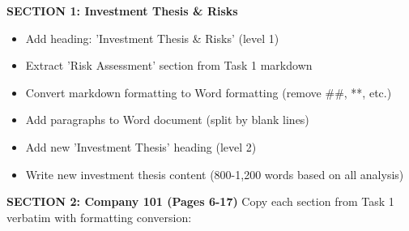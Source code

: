 \documentclass[11pt]{article}
\begin{document}
\textbf{SECTION 1: Investment Thesis \& Risks}

\begin{itemize}[leftmargin=*,itemsep=2pt,topsep=2pt]
\item {} Add heading: 'Investment Thesis \& Risks' (level 1)
\item {} Extract 'Risk Assessment' section from Task 1 markdown
\item {} Convert markdown formatting to Word formatting (remove \#\#, **, etc.)
\item {} Add paragraphs to Word document (split by blank lines)
\item {} Add new 'Investment Thesis' heading (level 2)
\item {} Write new investment thesis content (800-1,200 words based on all analysis)
\end{itemize}

\textbf{SECTION 2: Company 101 (Pages 6-17)} Copy each section from Task 1 verbatim with formatting conversion:
\end{document}
